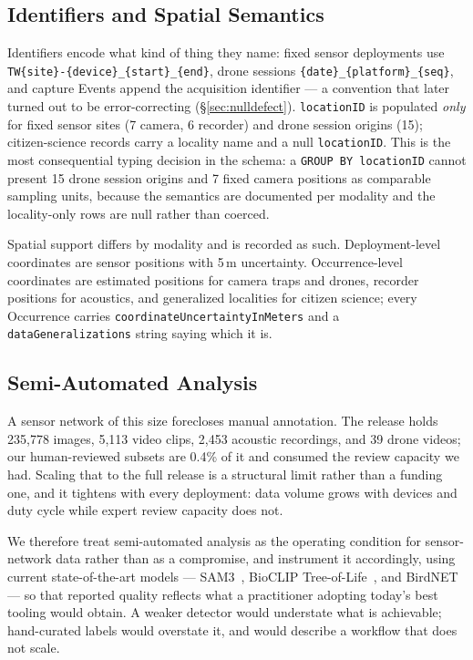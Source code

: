 \documentclass[sigconf]{acmart}
\begin{document}
\subsection{Identifiers and Spatial Semantics}
\label{sec:identifiers}

Identifiers encode what kind of thing they name: fixed sensor
deployments use \texttt{TW\{site\}-\{device\}\_\{start\}\_\{end\}},
drone sessions \texttt{\{date\}\_\{platform\}\_\{seq\}}, and capture
Events append the acquisition identifier --- a convention that later
turned out to be error-correcting (\S\ref{sec:nulldefect}).
\texttt{locationID} is populated \emph{only} for fixed sensor sites
(7 camera, 6 recorder) and drone session origins (15); citizen-science
records carry a locality name and a null \texttt{locationID}. This is the most consequential typing decision in
the schema: a \texttt{GROUP BY locationID} cannot present 15 drone
session origins and 7 fixed camera positions as comparable sampling
units, because the semantics are documented per modality and the
locality-only rows are null rather than coerced.

Spatial support differs by modality and is recorded as such.
Deployment-level coordinates are sensor positions with 5\,m uncertainty.
Occurrence-level coordinates are estimated positions for camera traps
and drones, recorder positions for acoustics, and generalized localities
for citizen science; every Occurrence carries
\texttt{coordinateUncertaintyInMeters} and a
\texttt{dataGeneralizations} string saying which it is.

\subsection{Semi-Automated Analysis}
\label{sec:provenance}

A sensor network of this size forecloses manual annotation. The release
holds 235{,}778 images, 5{,}113 video clips, 2{,}453 acoustic
recordings, and 39 drone videos; our human-reviewed subsets are 0.4\% of
it and consumed the review capacity we had. Scaling that to the full
release is a structural limit rather than a funding one, and it tightens
with every deployment: data volume grows with devices and duty cycle
while expert review capacity does not.

We therefore treat semi-automated analysis as the operating condition
for sensor-network data rather than as a compromise, and instrument it
accordingly, using current state-of-the-art models ---
SAM3~\cite{carion2026sam}, BioCLIP
Tree-of-Life~\cite{stevens2024bioclip,gu2025bioclip,treeoflife_200m},
and BirdNET~\cite{kahl2021birdnet} --- so that reported quality reflects
what a practitioner adopting today's best tooling would obtain. A weaker
detector would understate what is achievable; hand-curated labels would
overstate it, and would describe a workflow that does not scale.
\end{document}
